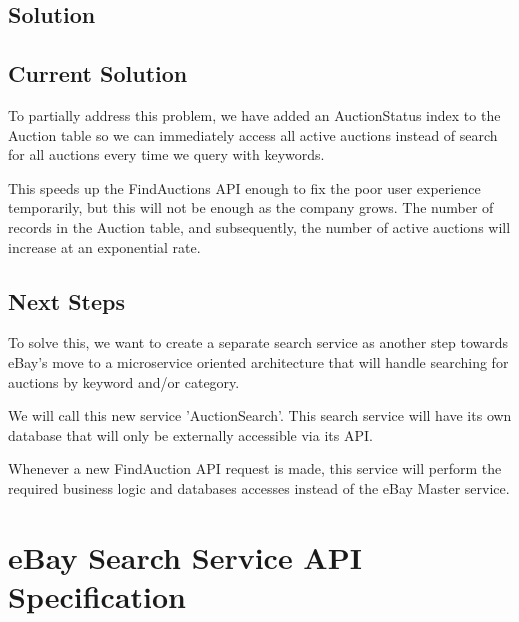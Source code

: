 \documentclass[12pt,a4paper]{article}
\begin{document}
\vspace{\baselineskip}

\subsection{Solution}
\subsection{Current Solution}
To partially address this problem, we have added an AuctionStatus index to the
Auction table so we can immediately access all active auctions instead of
search for all auctions every time we query with keywords. 

\vspace{\baselineskip}
This speeds up the FindAuctions API enough to fix the poor user experience
temporarily, but this will not be enough as the company grows. The number of
records in the Auction table, and subsequently, the number of active auctions
will increase at an exponential rate. 

\subsection{Next Steps}

To solve this, we want to create a separate search service as another step 
towards eBay's move to a microservice oriented architecture that will handle
searching for auctions by keyword and/or category.

\vspace{\baselineskip} 

We will call this new service 'AuctionSearch'. This search service will have
its own database that will only be externally accessible via its API.
\vspace{\baselineskip}

Whenever a new FindAuction API request is made, this service will perform
the required business logic and databases accesses instead of the eBay Master service.



 
\section{eBay Search Service API Specification}
\end{document}
